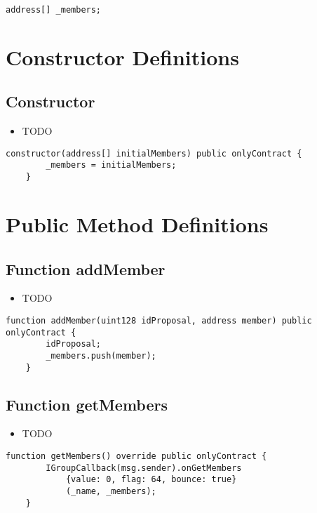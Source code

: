 \begin{lstlisting}[firstnumber=12]
    address[] _members;
\end{lstlisting}

\section{Constructor Definitions}


\subsection{Constructor}

\begin{itemize}
\item TODO
\end{itemize}

\begin{lstlisting}[firstnumber=15]
    constructor(address[] initialMembers) public onlyContract {
        _members = initialMembers;
    }
\end{lstlisting}

\section{Public Method Definitions}


\subsection{Function addMember}

\begin{itemize}
\item TODO
\end{itemize}

\begin{lstlisting}[firstnumber=25]
    function addMember(uint128 idProposal, address member) public onlyContract {
        idProposal;
        _members.push(member);
    }
\end{lstlisting}

\subsection{Function getMembers}

\begin{itemize}
\item TODO
\end{itemize}

\begin{lstlisting}[firstnumber=19]
    function getMembers() override public onlyContract {
        IGroupCallback(msg.sender).onGetMembers
            {value: 0, flag: 64, bounce: true}
            (_name, _members);
    }
\end{lstlisting}

